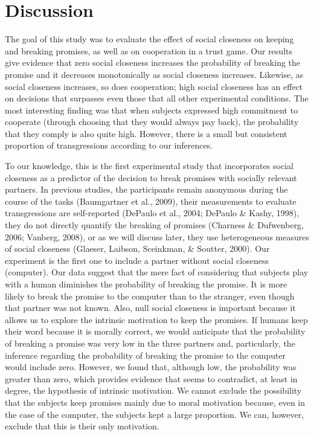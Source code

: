 \documentclass[12pt,]{article}
\begin{document}
\hypertarget{discussion}{%
\section{Discussion}\label{discussion}}

The goal of this study was to evaluate the effect of social closeness on
keeping and breaking promises, as well as on cooperation in a trust
game. Our results give evidence that zero social closeness increases the
probability of breaking the promise and it decreases monotonically as
social closeness increases. Likewise, as social closeness increases, so
does cooperation; high social closeness has an effect on decisions that
surpasses even those that all other experimental conditions. The most
interesting finding was that when subjects expressed high commitment to
cooperate (through choosing that they would always pay back), the
probability that they comply is also quite high. However, there is a
small but consistent proportion of transgressions according to our
inferences.

To our knowledge, this is the first experimental study that incorporates
social closeness as a predictor of the decision to break promises with
socially relevant partners. In previous studies, the participants remain
anonymous during the course of the tasks (Baumgartner et al., 2009),
their measurements to evaluate transgressions are self-reported (DePaulo
et al., 2004; DePaulo \& Kashy, 1998), they do not directly quantify the
breaking of promises (Charness \& Dufwenberg, 2006; Vanberg, 2008), or
as we will discuss later, they use heterogeneous measures of social
closeness (Glaeser, Laibson, Sceinkman, \& Soutter, 2000). Our
experiment is the first one to include a partner without social
closeness (computer). Our data suggest that the mere fact of considering
that subjects play with a human diminishes the probability of breaking
the promise. It is more likely to break the promise to the computer than
to the stranger, even though that partner was not known. Also, null
social closeness is important because it allows us to explore the
intrinsic motivation to keep the promises. If humans keep their word
because it is morally correct, we would anticipate that the probability
of breaking a promise was very low in the three partners and,
particularly, the inference regarding the probability of breaking the
promise to the computer would include zero. However, we found that,
although low, the probability was greater than zero, which provides
evidence that seems to contradict, at least in degree, the hypothesis of
intrinsic motivation. We cannot exclude the possibility that the
subjects keep promises mainly due to moral motivation because, even in
the case of the computer, the subjects kept a large proportion. We can,
however, exclude that this is their only motivation.
\end{document}
